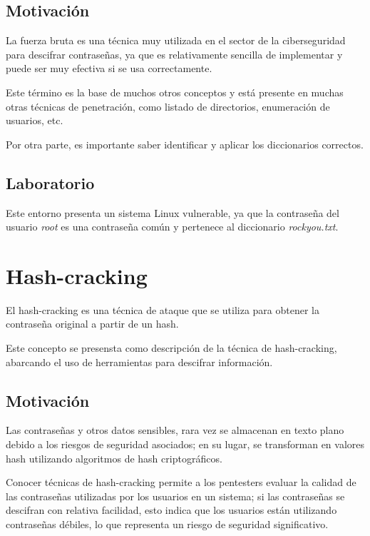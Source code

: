         \subsection{Motivación}

            La fuerza bruta es una técnica muy utilizada en el sector de la ciberseguridad para descifrar contraseñas, ya que es relativamente sencilla de implementar y puede ser muy efectiva si se usa correctamente.

            Este término es la base de muchos otros conceptos y está presente en muchas otras técnicas de penetración, como listado de directorios, enumeración de usuarios, etc.

            Por otra parte, es importante saber identificar y aplicar los diccionarios correctos.

        \subsection{Laboratorio}

            Este entorno presenta un sistema Linux vulnerable, ya que la contraseña del usuario \textit{root} es una contraseña común y pertenece al diccionario \textit{rockyou.txt}.


    \section{Hash-cracking}
        \label{sec:hash-cracking}

        El hash-cracking es una técnica de ataque que se utiliza para obtener la contraseña original a partir de un hash.

        Este concepto se presensta como descripción de la técnica de hash-cracking, abarcando el uso de herramientas para descifrar información.

        \subsection{Motivación}

            Las contraseñas y otros datos sensibles, rara vez se almacenan en texto plano debido a los riesgos de seguridad asociados; en su lugar, se transforman en valores hash utilizando algoritmos de hash criptográficos.
            
            Conocer técnicas de hash-cracking permite a los pentesters evaluar la calidad de las contraseñas utilizadas por los usuarios en un sistema; si las contraseñas se descifran con relativa facilidad, esto indica que los usuarios están utilizando contraseñas débiles, lo que representa un riesgo de seguridad significativo.
            
